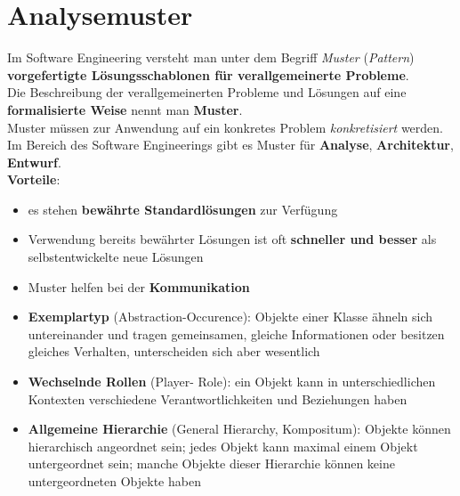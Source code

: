 \section{Analysemuster}

\begin{tcolorbox}[title=Analysemuster]
    Im Software Engineering versteht man unter dem Begriff \textit{Muster} (\textit{Pattern}) \textbf{vorgefertigte Lösungsschablonen für verallgemeinerte Probleme}.\\
    Die Beschreibung der verallgemeinerten Probleme und Lösungen auf eine \textbf{formalisierte Weise} nennt man \textbf{Muster}.\\
    Muster müssen zur Anwendung auf ein konkretes Problem \textit{konkretisiert} werden.\\
    Im Bereich des Software Engineerings gibt es Muster für \textbf{Analyse}, \textbf{Architektur}, \textbf{Entwurf}.\\

    \noindent
    \textbf{Vorteile}:
    \begin{itemize}
        \item es stehen \textbf{bewährte Standardlösungen} zur Verfügung
        \item Verwendung bereits bewährter Lösungen ist oft \textbf{schneller und besser} als selbstentwickelte neue Lösungen
        \item Muster helfen bei der \textbf{Kommunikation}
    \end{itemize}
\end{tcolorbox}

\begin{tcolorbox}[title=Beispiele]
    \begin{itemize}
        \item \textbf{Exemplartyp} (Abstraction-Occurence): Objekte einer Klasse ähneln sich untereinander und tragen gemeinsamen, gleiche Informationen oder besitzen gleiches  Verhalten, unterscheiden sich aber wesentlich
        \item \textbf{Wechselnde Rollen} (Player- Role): ein Objekt kann in unterschiedlichen Kontexten verschiedene Verantwortlichkeiten und Beziehungen haben
        \item \textbf{Allgemeine Hierarchie} (General Hierarchy, Kompositum): Objekte können hierarchisch angeordnet sein;
         jedes Objekt kann maximal einem Objekt untergeordnet sein;
         manche Objekte dieser Hierarchie können keine untergeordneten Objekte haben
    \end{itemize}
\end{tcolorbox}

